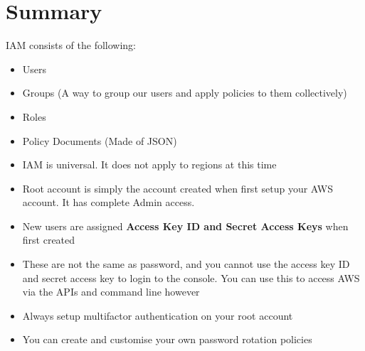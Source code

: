 \documentclass{article}
\begin{document}
\section{Summary}
IAM consists of the following:
\begin{itemize}

\item
Users

\item
Groups (A way to group our users and apply policies to them collectively)

\item
Roles

\item
Policy Documents (Made of JSON)

\item
IAM is universal. It does not apply to regions at this time

\item
Root account is simply the account created when first setup your AWS account. It has complete Admin access.

\item 
New users are assigned \textbf{Access Key ID and Secret Access Keys} when first created

\item 
These are not the same as password, and you cannot use the access key ID and secret access key to login to the console. You can use this to access AWS via the APIs and command line however

\item
Always setup multifactor authentication on your root account

\item
You can create and customise your own password rotation policies

\end{itemize}
\end{document}
